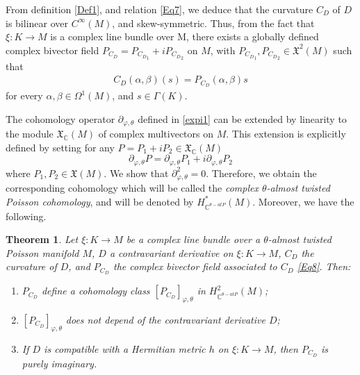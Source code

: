 \documentclass[a4paper,10pt]{article}
\numberwithin{equation}{section}
\theoremstyle{plain}
\newtheorem{theorem}{Theorem}[section]
\begin{document}
	From definition \ref{Def1}, and relation \eqref{Eq7}, we deduce that the curvature  $C_D$ of $D$ is bilinear over $C^\infty(M)$, and skew-symmetric. Thus, from the fact that  $\xi: K\to M$ is a complex line bundle  over M,  there exists a globally defined complex bivector  field $P_{C_D}= P_{{C_D}_1}+iP_{{C_D}_2}$ on $M$, with $P_{{C_D}_1},P_{{C_D}_2}\in \mathfrak{X}^2(M)$ such that
	\begin{align}\label{Eq8}
	C_D(\alpha,\beta)(s)= P_{C_D}(\alpha,\beta)s
	\end{align}
	for every $\alpha,\beta\in \Omega^1(M)$, and $s\in \Gamma (K)$.
	
	
	The cohomology operator $\partial_{\varphi,\theta}$ defined in \eqref{expi1} can be extended by linearity  to the module $\mathfrak{X}_{\mathbb{C}}(M)$ of complex multivectors on $M$.  This extension is explicitly defined by setting  for any
	$P=P_1+iP_2\in  \mathfrak{X}_{\mathbb{C}}(M)$
	$$\partial_{\varphi,\theta}P=\partial_{\varphi,\theta}P_1+i\partial_{\varphi,\theta}P_2$$  where  $P_1,P_2\in \mathfrak{X}(M)$.
	We show that  $\partial_{\varphi,\theta}^2=0$.  Therefore, we obtain the corresponding cohomology which will be called the \textit{complex $\theta$-almost twisted Poisson cohomology}, and will be   denoted by  $H_{\mathbb{C}^{\theta-atP}}^{*}(M)$.  Moreover, we have the following.
	
	\begin{theorem}\label{theo3.1}
		Let $\xi: K\to M$ be   a complex line bundle over a $\theta$-almost twisted Poisson manifold $M$,  $D$  a contravariant derivative on  $\xi: K\to M$,  $C_D$ the curvature of $D$, and $P_{C_D}$ the complex bivector field associated to $C_D$ \eqref{Eq8}. Then:
		\begin{enumerate}
			\item[(i)]  $P_{C_D}$ define a cohomology class  $[P_{C_D}]_{\varphi,\theta}$ in $H_{\mathbb{C}^{\theta-atP}}^{2}(M)$;
			\item[(ii)] $[P_{C_D}]_{\varphi,\theta}$ does not depend of the contravariant derivative $D$;
			\item[(ii)] If $D$ is compatible with a Hermitian metric $h$ on  $\xi: K\to M$, then  $P_{C_D}$ is purely imaginary.
		\end{enumerate}
	\end{theorem}
	
\end{document}
